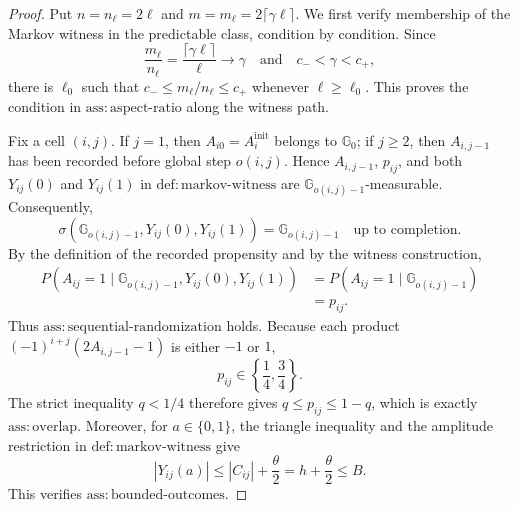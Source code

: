 \documentclass{article}
\begin{document}
\begin{proof}
Put \(n=n_\ell=2\ell\) and \(m=m_\ell=2\lceil\gamma\ell\rceil\).  We first verify membership of the Markov witness in the predictable class, condition by condition.  Since
\[
 \frac{m_\ell}{n_\ell}=\frac{\lceil\gamma\ell\rceil}{\ell}\longrightarrow\gamma
 \quad\text{and}\quad c_-<\gamma<c_+,
\]
there is \(\ell_0\) such that \(c_-\le m_\ell/n_\ell\le c_+\) whenever \(\ell\ge\ell_0\).  This proves the condition in \(\mathrm{ass:aspect\mbox{-}ratio}\) along the witness path.

Fix a cell \((i,j)\).  If \(j=1\), then \(A_{i0}=A_i^{\mathrm{init}}\) belongs to \(\mathbb G_0\); if \(j\ge2\), then \(A_{i,j-1}\) has been recorded before global step \(o(i,j)\).  Hence \(A_{i,j-1}\), \(p_{ij}\), and both \(Y_{ij}(0)\) and \(Y_{ij}(1)\) in \(\mathrm{def:markov\mbox{-}witness}\) are \(\mathbb G_{o(i,j)-1}\)-measurable.  Consequently,
\[
 \sigma\!\left(\mathbb G_{o(i,j)-1},Y_{ij}(0),Y_{ij}(1)\right)
 =\mathbb G_{o(i,j)-1}
 \quad\text{up to completion}.
\]
By the definition of the recorded propensity and by the witness construction,
\[
 \begin{aligned}
 P\!\left(A_{ij}=1\mid\mathbb G_{o(i,j)-1},Y_{ij}(0),Y_{ij}(1)\right)
 &=P\!\left(A_{ij}=1\mid\mathbb G_{o(i,j)-1}\right)\\
 &=p_{ij}.
 \end{aligned}
\]
Thus \(\mathrm{ass:sequential\mbox{-}randomization}\) holds.  Because each product \((-1)^{i+j}(2A_{i,j-1}-1)\) is either \(-1\) or \(1\),
\[
 p_{ij}\in\left\{\frac14,\frac34\right\}.
\]
The strict inequality \(q<1/4\) therefore gives \(q\le p_{ij}\le1-q\), which is exactly \(\mathrm{ass:overlap}\).  Moreover, for \(a\in\{0,1\}\), the triangle inequality and the amplitude restriction in \(\mathrm{def:markov\mbox{-}witness}\) give
\[
 |Y_{ij}(a)|\le |C_{ij}|+\frac{\theta}{2}
 =h+\frac{\theta}{2}\le B.
\]
This verifies \(\mathrm{ass:bounded\mbox{-}outcomes}\).


\end{proof}
\end{document}
